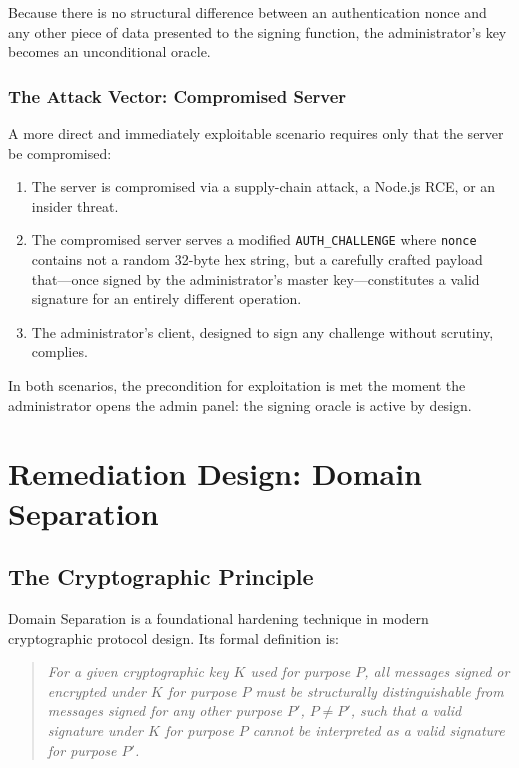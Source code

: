 \documentclass[12pt,a4paper]{article}
\begin{document}
Because there is no structural difference between an authentication nonce and any other piece of data presented to the signing function, the administrator's key becomes an unconditional oracle.

\subsubsection{The Attack Vector: Compromised Server}

A more direct and immediately exploitable scenario requires only that the server be compromised:

\begin{enumerate}
    \item The server is compromised via a supply-chain attack, a Node.js RCE, or an insider threat.
    \item The compromised server serves a modified \texttt{AUTH\_CHALLENGE} where \texttt{nonce} contains not a random 32-byte hex string, but a carefully crafted payload that---once signed by the administrator's master key---constitutes a valid signature for an entirely different operation.
    \item The administrator's client, designed to sign any challenge without scrutiny, complies.
\end{enumerate}

In both scenarios, the precondition for exploitation is met the moment the administrator opens the admin panel: the signing oracle is active by design.

\section{Remediation Design: Domain Separation}

\subsection{The Cryptographic Principle}

Domain Separation is a foundational hardening technique in modern cryptographic protocol design. Its formal definition is:

\begin{quote}
\textit{For a given cryptographic key $K$ used for purpose $P$, all messages signed or encrypted under $K$ for purpose $P$ must be structurally distinguishable from messages signed for any other purpose $P'$, $P \neq P'$, such that a valid signature under $K$ for purpose $P$ cannot be interpreted as a valid signature for purpose $P'$.}
\end{quote}
\end{document}
